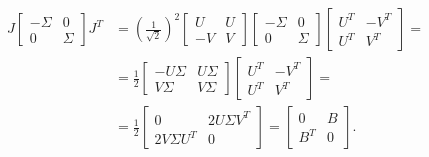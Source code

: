 \begin{equation*}
    \begin{split}
        J \begin{bmatrix} -\Sigma & 0 \\ 0 & \Sigma \end{bmatrix} J^T 
        &= \left( \frac{1}{\sqrt{2}}\right)^2 
            \begin{bmatrix} U & U \\ -V & V \end{bmatrix}
            \begin{bmatrix} -\Sigma & 0 \\ 0 & \Sigma \end{bmatrix}
            \begin{bmatrix} U^T & -V^T \\ U^T & V^T \end{bmatrix}= \\[6pt]
        &= \frac{1}{2} 
            \begin{bmatrix} -U\Sigma & U\Sigma \\ V\Sigma & V\Sigma \end{bmatrix}
            \begin{bmatrix} U^T & -V^T \\ U^T & V^T \end{bmatrix}=\\[6pt] 
        &= \frac{1}{2} 
            \begin{bmatrix} 0 & 2 U\Sigma V^T \\ 2 V\Sigma U^T & 0 \end{bmatrix} = \begin{bmatrix} 0 & B \\ B^T & 0 \end{bmatrix}.
    \end{split}
\end{equation*}

